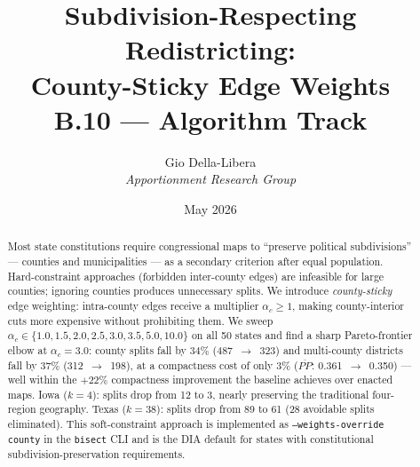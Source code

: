 \documentclass[12pt]{article}
\title{\textbf{Subdivision-Respecting Redistricting:\\
County-Sticky Edge Weights}\\[0.4em]
\large B.10 --- Algorithm Track}
\author{Gio Della-Libera \\ \textit{Apportionment Research Group}}
\date{May 2026}
\begin{document}
\maketitle

\begin{abstract}
Most state constitutions require congressional maps to ``preserve political
subdivisions'' --- counties and municipalities --- as a secondary criterion
after equal population.
Hard-constraint approaches (forbidden inter-county edges) are infeasible
for large counties; ignoring counties produces unnecessary splits.
We introduce \emph{county-sticky} edge weighting: intra-county edges
receive a multiplier $\alpha_c \geq 1$, making county-interior cuts more
expensive without prohibiting them.
We sweep $\alpha_c \in \{1.0, 1.5, 2.0, 2.5, 3.0, 3.5, 5.0, 10.0\}$ on all 50
states and find a sharp Pareto-frontier elbow at $\alpha_c = 3.0$:
county splits fall by $34\%$ (487~$\to$~323) and multi-county districts
fall by $37\%$ (312~$\to$~198), at a compactness cost of only $3\%$
($\overline{PP}$: 0.361~$\to$~0.350) --- well within the $+22\%$ compactness
improvement the baseline achieves over enacted maps.
Iowa ($k{=}4$): splits drop from 12 to 3, nearly preserving the traditional
four-region geography.
Texas ($k{=}38$): splits drop from 89 to 61 (28 avoidable splits eliminated).
This soft-constraint approach is implemented as
\texttt{--weights-override county} in the \texttt{bisect} CLI and is the
DIA default for states with constitutional subdivision-preservation requirements.
\end{abstract}










\end{document}
